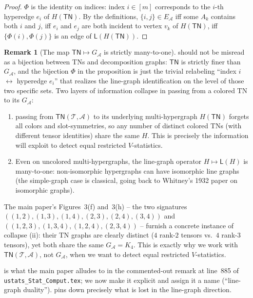 \documentclass[11pt]{article}
\newcommand{\calA}{\mathcal{A}}
\newcommand{\calT}{\mathcal{T}}
\newcommand{\TN}{\mathsf{TN}}
\newcommand{\LG}{\mathsf{L}}                       %
\theoremstyle{plain}
\theoremstyle{definition}
\newtheorem{remark}[theorem]{Remark}
\begin{document}
\begin{proof}
$\Phi$ is the identity on indices: index $i\in[m]$ corresponds to the
$i$-th hyperedge $e_i$ of $H(\TN)$.  By the definitions, $\{i,j\}\in
E_\calA$ iff some $A_k$ contains both $i$ and $j$, iff $e_i$ and $e_j$
are both incident to vertex $v_k$ of $H(\TN)$, iff $\{\Phi(i),\Phi(j)\}$
is an edge of $\LG(H(\TN))$.
\end{proof}

\begin{remark}[The map $\TN\mapsto G_\calA$ is strictly many-to-one]
\label{rem:tn-to-ga-not-bijective}
 should not be misread as a bijection
between TNs and decomposition graphs: $\TN$ is strictly finer than
$G_\calA$, and the bijection $\Phi$ in the proposition is just the
trivial relabeling ``index $i$ $\leftrightarrow$ hyperedge $e_i$'' that
realizes the line-graph identification on the level of those two
specific sets.  Two layers of information collapse in passing from a
colored TN to its $G_\calA$:
\begin{enumerate}[label=\textup{(\roman*)},leftmargin=2em]
\item passing from $\TN(\calT,\calA)$ to its underlying multi-hypergraph
$H(\TN)$ forgets all colors and slot-symmetries, so any number of
distinct colored TNs (with different tensor identities) share the same
$H$.  This is precisely the information  will
exploit to detect equal restricted $V$-statistics.
\item Even on uncolored multi-hypergraphs, the line-graph operator
$H\mapsto\LG(H)$ is many-to-one: non-isomorphic hypergraphs can have
isomorphic line graphs (the simple-graph case is classical, going back
to Whitney's 1932 paper on isomorphic graphs).
\end{enumerate}
The main paper's Figures~3(f) and~3(h) -- the two signatures
$((1,2),(1,3),(1,4),(2,3),(2,4),(3,4))$ and
$((1,2,3),(1,3,4),(1,2,4),(2,3,4))$ -- furnish a concrete instance of
collapse (ii): their TN graphs are clearly distinct ($4$ rank-$2$
tensors vs.\ $4$ rank-$3$ tensors), yet both share the same
$G_\calA=K_4$.  This is exactly why we work with $\TN(\calT,\calA)$,
not $G_\calA$, when we want to detect equal restricted $V$-statistics.
\end{remark}

 is what the main paper alludes to in the
commented-out remark at line~885 of \texttt{ustats\_Stat\_Comput.tex}; we
now make it explicit and assign it a name (``line-graph duality'').
 pins down precisely what is lost in
the line-graph direction.
\end{document}
